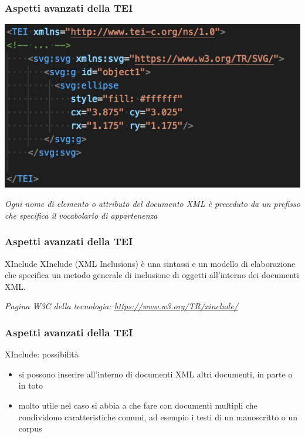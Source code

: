     \begin{frame}
        \frametitle{Aspetti avanzati della TEI}
        \addtocounter{nframe}{1}

        
            \begin{center}
                \includegraphics[width=.9\textwidth]{imgs/namespaces.png}
            \end{center}
        \textit{Ogni nome di elemento o attributo del documento XML è preceduto da un prefisso che specifica il vocabolario di appartenenza}
    \end{frame}

    \begin{frame}
        \frametitle{Aspetti avanzati della TEI}
        \addtocounter{nframe}{1}

        \begin{block}{XInclude}
            XInclude (XML Inclusions) è una sintassi e un modello di elaborazione che specifica un metodo generale di inclusione di oggetti all’interno dei documenti XML.
        \end{block}
        \textit{Pagina W3C della tecnologia: \url{https://www.w3.org/TR/xinclude/}}
    \end{frame}

    \begin{frame}
        \frametitle{Aspetti avanzati della TEI}
        \addtocounter{nframe}{1}

        \begin{block}{XInclude: possibilità}
            \begin{itemize}
                \item si possono inserire all’interno di documenti XML altri documenti, in parte o in toto
                \item molto utile nel caso si abbia a che fare con documenti multipli che condividono caratteristiche comuni, ad esempio i testi di un manoscritto o un corpus
            \end{itemize}
        \end{block}
    \end{frame}


